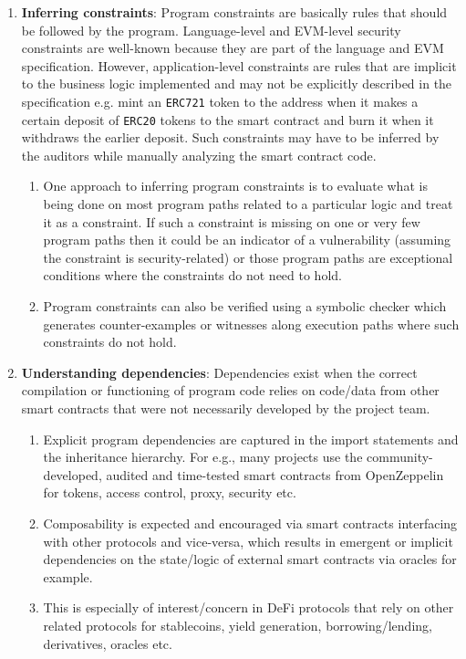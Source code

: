 \begin{enumerate}
\item\textbf{Inferring constraints}: Program constraints are basically rules that should be followed by the program. Language-level and EVM-level security constraints are well-known because they are part of the language and EVM specification. However, application-level constraints are rules that are implicit to the business logic implemented and may not be explicitly described in the specification e.g. mint an \verb|ERC721| token to the address when it makes a certain deposit of \verb|ERC20| tokens to the smart contract and burn it when it withdraws the earlier deposit. Such constraints may have to be inferred by the auditors while manually analyzing the smart contract code.
	\begin{enumerate}
	\item One approach to inferring program constraints is to evaluate what is being done on most program paths related to a particular logic and treat it as a constraint. If such a constraint is missing on one or very few program paths then it could be an indicator of a vulnerability (assuming the constraint is security-related) or those program paths are exceptional conditions where the constraints do not need to hold.
	\item Program constraints can also be verified using a symbolic checker which generates counter-examples or witnesses along execution paths where such constraints do not hold.
	\end{enumerate}

\item\textbf{Understanding dependencies}: Dependencies exist when the correct compilation or functioning of program code relies on code/data from other smart contracts that were not necessarily developed by the project team.
	\begin{enumerate}
	\item Explicit program dependencies are captured in the import statements and the inheritance hierarchy. For e.g., many projects use the community-developed, audited and time-tested smart contracts from OpenZeppelin for tokens, access control, proxy, security etc.
	\item Composability is expected and encouraged via smart contracts interfacing with other protocols and vice-versa, which results in emergent or implicit dependencies on the state/logic of external smart contracts via oracles for example.
	\item This is especially of interest/concern in DeFi protocols that rely on other related protocols for stablecoins, yield generation, borrowing/lending, derivatives, oracles etc.
	\end{enumerate}


\end{enumerate}

